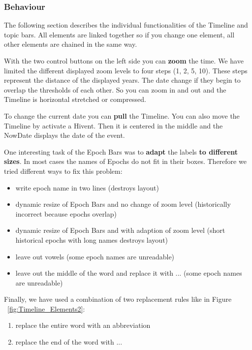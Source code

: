 \subsubsection{Behaviour}
The following section describes the individual functionalities of the Timeline and topic bars. All elements are linked together so if you change one element, all other elements are chained in the same way.

With the two control buttons on the left side you can \textbf{zoom} the time. We have limited the different displayed zoom levels to four steps (1, 2, 5, 10). These steps represent the distance of the displayed years. The date change if they begin to overlap the thresholds of each other. So you can zoom in and out and the Timeline is horizontal stretched or compressed.

To change the current date you can \textbf{pull} the Timeline. You can also move the Timeline by activate a Hivent. Then it is centered in the middle and the NowDate displays the date of the event.

One interesting task of the Epoch Bars was to \textbf{adapt} the labels \textbf{to different sizes}. In most cases the names of Epochs do not fit in their boxes. Therefore we tried different ways to fix this problem:

\begin{itemize}
	\item write epoch name in two lines (destroys layout)
	\item dynamic resize of Epoch Bars and no change of zoom level (historically incorrect because epochs overlap)
	\item dynamic resize of Epoch Bars and with adaption of zoom level (short historical epochs with long names destroys layout)
	\item leave out vowels (some epoch names are unreadable)
	\item leave out the middle of the word and replace it with ... (some epoch names are unreadable)
\end{itemize}

Finally, we have used a combination of two replacement rules like in Figure ~\ref{fig:Timeline_Elements2}:

\begin{enumerate}
	\item replace the entire word with an abbreviation
	\item replace the end of the word with ...
\end{enumerate}

